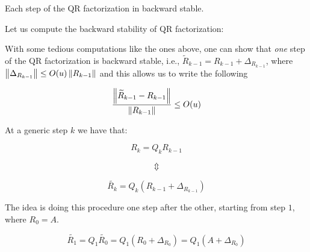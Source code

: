 \documentclass[ComputationalMathematics.tex]{subfiles}
\begin{document}

Each step of the QR factorization in backward stable.

Let us compute the backward stability of QR factorization:

With some tedious computations like the ones above, one can show that \emph{one} step of the QR factorization is backward stable, i.e., ${\widetilde{R}}_{k-1} = R_{k-1} + \Delta_{R_{k-1}}$, where $\left\lVert\Delta_{R_{k-1}}\right\rVert \le O(u) \left\lVert R_{k-1}\right\rVert$ and this allows us to write the following

\[
  \frac{\left\lVert{\widetilde{R}}_{k-1} - R_{k-1}\right\rVert}{\left\lVert R_{k-1}\right\rVert} \le O(u)
\]

At a generic step $k$ we have that:

\[
  R_k = Q_k R_{k-1}
\]

\[
  \Updownarrow
\]

\[
  \widetilde{R_k} = Q_k (R_{k-1} + \Delta_{R_{k-1}})
\]

The idea is doing this procedure one step after the other, starting from step $1$, where $R_0 = A$.

\[
  \widetilde{R_1} = Q_1 \widetilde{R_0} = Q_1 (R_0 + \Delta_{R_0}) = Q_1 (A + \Delta_{R_0})
\]
\end{document}
